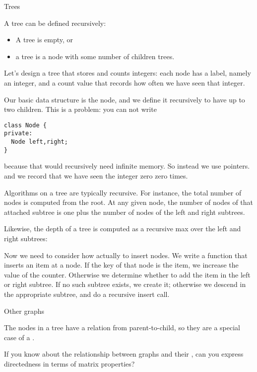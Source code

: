  {Trees}

A tree can be defined recursively:
\begin{itemize}
\item A tree is empty, or
\item a tree is a node with some number of children trees.
\end{itemize}
Let's design a tree that stores and counts integers: each node has a
label, namely an integer, and a count value that records how often we
have seen that integer.

Our basic data structure is the node, and we define it recursively to
have up to two children. This is a problem: you can not write
\begin{lstlisting}
class Node {
private:
  Node left,right;
}
\end{lstlisting}
because that would recursively need infinite memory. So instead we use pointers.
%
%
and we record that we have seen the integer zero zero times.

Algorithms on a tree are typically recursive. For instance, the total
number of nodes is computed from the root. At any given node, the
number of nodes of that attached subtree is one plus the number of
nodes of the left and right subtrees.
%

Likewise, the depth of a tree is computed as a recursive max over the
left and right subtrees:
%

Now we need to consider how actually to insert nodes. We write a
function that inserts an item at a node. If the key of that node is
the item, we increase the value of the counter. Otherwise we determine
whether to add the item in the left or right subtree. If no such
subtree exists, we create it; otherwise we descend in the appropriate
subtree, and do a recursive insert call.
%



 {Other graphs}

The nodes in a tree have a relation from parent-to-child, so
they are a special case of a .

\begin{exercise}
  If you know about the relationship between graphs and their
  ,
  can you express directedness in terms of matrix properties?
\end{exercise}

